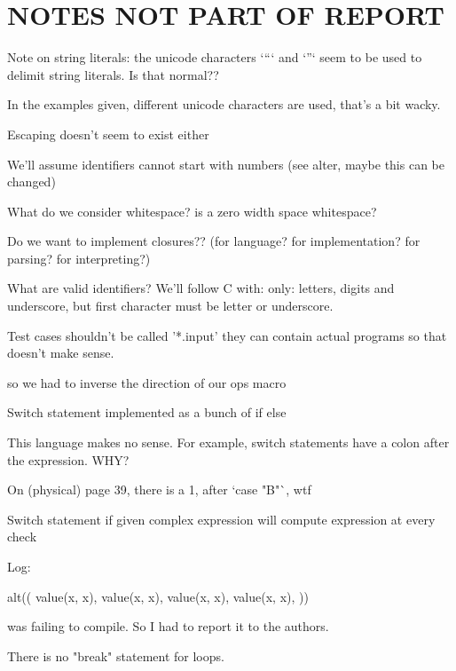 \documentclass{article}
\begin{document}


\section{NOTES NOT PART OF REPORT}

Note on string literals: the unicode characters `“` and `”` seem to be used to
delimit string literals. Is that normal??

In the examples given, different unicode characters are used, that's a bit
wacky.

Escaping doesn't seem to exist either

We'll assume identifiers cannot start with numbers (see alter, maybe this can
be changed)

What do we consider whitespace? is a zero width space whitespace?

Do we want to implement closures?? (for language? for implementation? for parsing? for interpreting?)

What are valid identifiers? We'll follow C with: only: letters, digits and
underscore, but first character must be letter or underscore.

Test cases shouldn't be called '*.input' they can contain actual programs so
that doesn't make sense.


so we had to inverse the direction of our ops macro


Switch statement implemented as a bunch of if else

This language makes no sense. For example, switch statements have a colon after
the expression. WHY?

On (physical) page 39, there is a 1, after `case "B"`, wtf

Switch statement if given complex expression will compute expression at every
check

Log:


alt((
	value(x, x),
	value(x, x),
	value(x, x),
	value(x, x),
))

was failing to compile. So I had to report it to the authors.

There is no "break" statement for loops.
\end{document}
